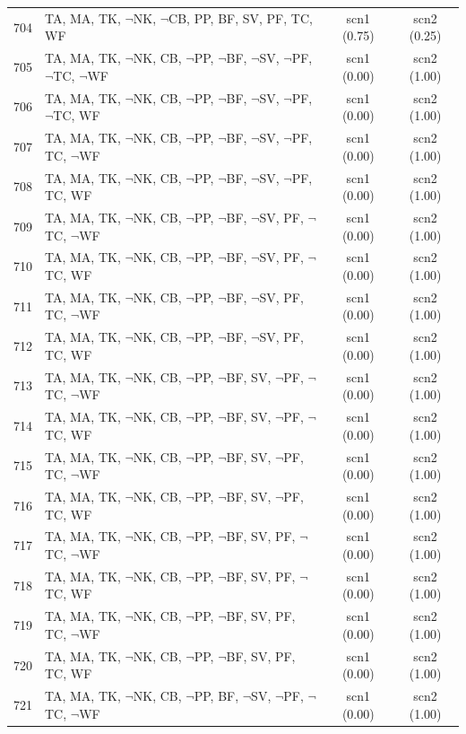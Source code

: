 \documentclass[12pt]{article}
\begin{document}
\begin{longtable}{|l|l|c|c|}
704 & TA, MA, TK, $\neg$NK, $\neg$CB, PP, BF, SV, PF, TC, WF & scn1 (0.75) & scn2 (0.25)\\
705 & TA, MA, TK, $\neg$NK, CB, $\neg$PP, $\neg$BF, $\neg$SV, $\neg$PF, $\neg$TC, $\neg$WF & scn1 (0.00) & scn2 (1.00)\\
706 & TA, MA, TK, $\neg$NK, CB, $\neg$PP, $\neg$BF, $\neg$SV, $\neg$PF, $\neg$TC, WF & scn1 (0.00) & scn2 (1.00)\\
707 & TA, MA, TK, $\neg$NK, CB, $\neg$PP, $\neg$BF, $\neg$SV, $\neg$PF, TC, $\neg$WF & scn1 (0.00) & scn2 (1.00)\\
708 & TA, MA, TK, $\neg$NK, CB, $\neg$PP, $\neg$BF, $\neg$SV, $\neg$PF, TC, WF & scn1 (0.00) & scn2 (1.00)\\
709 & TA, MA, TK, $\neg$NK, CB, $\neg$PP, $\neg$BF, $\neg$SV, PF, $\neg$TC, $\neg$WF & scn1 (0.00) & scn2 (1.00)\\
710 & TA, MA, TK, $\neg$NK, CB, $\neg$PP, $\neg$BF, $\neg$SV, PF, $\neg$TC, WF & scn1 (0.00) & scn2 (1.00)\\
711 & TA, MA, TK, $\neg$NK, CB, $\neg$PP, $\neg$BF, $\neg$SV, PF, TC, $\neg$WF & scn1 (0.00) & scn2 (1.00)\\
712 & TA, MA, TK, $\neg$NK, CB, $\neg$PP, $\neg$BF, $\neg$SV, PF, TC, WF & scn1 (0.00) & scn2 (1.00)\\
713 & TA, MA, TK, $\neg$NK, CB, $\neg$PP, $\neg$BF, SV, $\neg$PF, $\neg$TC, $\neg$WF & scn1 (0.00) & scn2 (1.00)\\
714 & TA, MA, TK, $\neg$NK, CB, $\neg$PP, $\neg$BF, SV, $\neg$PF, $\neg$TC, WF & scn1 (0.00) & scn2 (1.00)\\
715 & TA, MA, TK, $\neg$NK, CB, $\neg$PP, $\neg$BF, SV, $\neg$PF, TC, $\neg$WF & scn1 (0.00) & scn2 (1.00)\\
716 & TA, MA, TK, $\neg$NK, CB, $\neg$PP, $\neg$BF, SV, $\neg$PF, TC, WF & scn1 (0.00) & scn2 (1.00)\\
717 & TA, MA, TK, $\neg$NK, CB, $\neg$PP, $\neg$BF, SV, PF, $\neg$TC, $\neg$WF & scn1 (0.00) & scn2 (1.00)\\
718 & TA, MA, TK, $\neg$NK, CB, $\neg$PP, $\neg$BF, SV, PF, $\neg$TC, WF & scn1 (0.00) & scn2 (1.00)\\
719 & TA, MA, TK, $\neg$NK, CB, $\neg$PP, $\neg$BF, SV, PF, TC, $\neg$WF & scn1 (0.00) & scn2 (1.00)\\
720 & TA, MA, TK, $\neg$NK, CB, $\neg$PP, $\neg$BF, SV, PF, TC, WF & scn1 (0.00) & scn2 (1.00)\\
721 & TA, MA, TK, $\neg$NK, CB, $\neg$PP, BF, $\neg$SV, $\neg$PF, $\neg$TC, $\neg$WF & scn1 (0.00) & scn2 (1.00)\\

\end{longtable}
\end{document}
